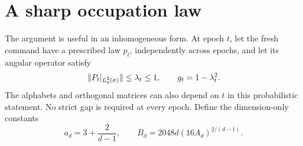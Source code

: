\section{A sharp occupation law}\label{sec:width}
The argument is useful in an inhomogeneous form. At epoch $t$, let the
fresh command have a prescribed law $p_t$, independently across epochs,
and let its angular operator satisfy
\[
 \lVert P_t|_{L^2_0(\sigma)}\rVert\le\lambda_t\le1,
 \qquad g_t=1-\lambda_t^2.
\]
The alphabets and orthogonal matrices can also depend on $t$ in this
probabilistic statement. No strict gap is required at every epoch.
Define the dimension-only constants
\begin{equation}\label{eq:constants}
 a_d=3+\frac2{d-1},\qquad
 B_d=2048d(16A_d)^{2/(d-1)}.
\end{equation}

